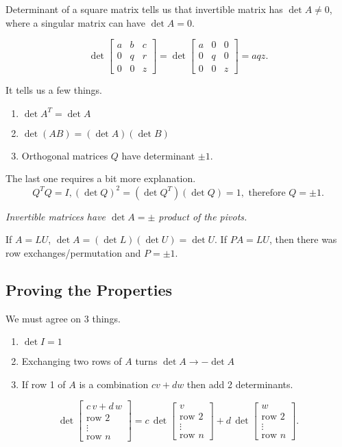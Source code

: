 Determinant of a square matrix tells us that invertible matrix has \(\det A \neq 0\), where a singular matrix can have \(\det A = 0\). 

\[
\det\!\begin{bmatrix}
a & b & c\\
0 & q & r\\
0 & 0 & z
\end{bmatrix}
=
\det\!\begin{bmatrix}
a & 0 & 0\\
0 & q & 0\\
0 & 0 & z
\end{bmatrix}
= aqz.
\]

It tells us a few things. 

\begin{enumerate}
  \item \(\det A^T = \det A\)
  \item \(\det (AB) = (\det A)(\det B)\)  
  \item Orthogonal matrices \(Q\) have determinant \(\pm 1\).  
\end{enumerate}

The last one requires a bit more explanation. 
\[
  Q^T Q = I, (\det Q)^2 = (\det Q^T)(\det Q) = 1, \text{ therefore } Q = \pm 1. 
\]

\emph{Invertible matrices have \(\det A = \pm\) product of the pivots. }

If \(A = LU\), \(\det A = (\det L)(\det U) = \det U\). 
If \(PA = LU\), then there was row exchanges/permutation and \(P = \pm 1\).     

\subsection{Proving the Properties}

We must agree on 3 things.
\begin{enumerate}
  \item \(\det I = 1\) 
  \item Exchanging two rows of \(A\) turns \(\det A \rightarrow - \det A\)
  \item If row 1 of \(A\) is a combination \(cv + dw\) then add 2 determinants.     
\end{enumerate}

\[
\det\begin{bmatrix}
c\,v + d\,w\\
\text{row }2\\
\vdots\\
\text{row }n
\end{bmatrix}
= c\,\det\!\begin{bmatrix}
v\\
\text{row }2\\
\vdots\\
\text{row }n
\end{bmatrix}
+ d\,\det\!\begin{bmatrix}
w\\
\text{row }2\\
\vdots\\
\text{row }n
\end{bmatrix}.
\]

